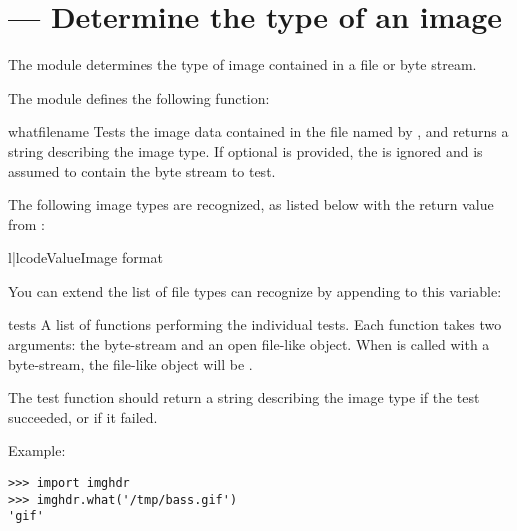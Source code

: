 \section{ ---
         Determine the type of an image}



The  module determines the type of image contained in a
file or byte stream.

The  module defines the following function:


\begin{funcdesc}{what}{filename}
Tests the image data contained in the file named by ,
and returns a string describing the image type.  If optional 
is provided, the  is ignored and  is assumed to
contain the byte stream to test.
\end{funcdesc}

The following image types are recognized, as listed below with the
return value from :

\begin{tableii}{l|l}{code}{Value}{Image format}
\end{tableii}


You can extend the list of file types  can recognize by
appending to this variable:

\begin{datadesc}{tests}
A list of functions performing the individual tests.  Each function
takes two arguments: the byte-stream and an open file-like object.
When  is called with a byte-stream, the file-like
object will be .

The test function should return a string describing the image type if
the test succeeded, or  if it failed.
\end{datadesc}

Example:

\begin{verbatim}
>>> import imghdr
>>> imghdr.what('/tmp/bass.gif')
'gif'
\end{verbatim}
